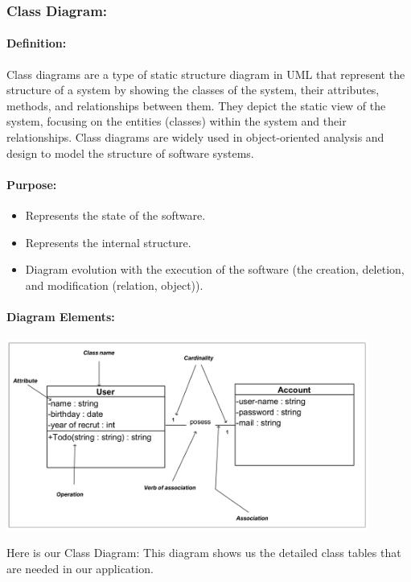 \documentclass{article}
\begin{document}
\newpage
\subsubsection*{Class Diagram:}

\paragraph*{\textbf{Definition:} }

Class diagrams are a type of static structure diagram in UML that represent the structure of a system by showing the classes of the system, their attributes, methods, and relationships between them. They depict the static view of the system, focusing on the entities (classes) within the system and their relationships. Class diagrams are widely used in object-oriented analysis and design to model the structure of software systems.

\paragraph*{\textbf{Purpose: }}
\begin{itemize}
    \item Represents the state of the software.
    \item Represents the internal structure.
    \item Diagram evolution with the execution of the software (the creation, deletion, and modification (relation, object)).

\end{itemize}
\paragraph*{\textbf{Diagram Elements: }}
\vspace{0.3cm}
\begin{center}
    \includegraphics[width=451px]{media/class_elements.png}
\end{center}
\vspace{1cm}
\noindent Here is our Class Diagram:
\newpage
This diagram shows us the detailed class tables that are needed in our application.
\end{document}
